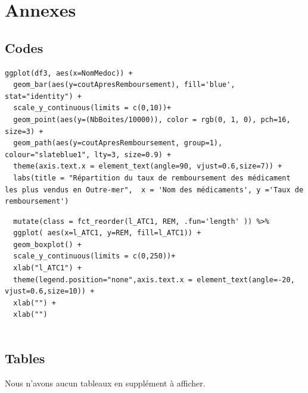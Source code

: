 \documentclass[mstat,12pt]{unswthesis}
\begin{document}



\hypertarget{annexes}{%
\chapter*{Annexes}\label{annexes}}

\hypertarget{codes}{%
\section*{\texorpdfstring{\textbf{Codes}}{Codes}}\label{codes}}

\begin{verbatim}
ggplot(df3, aes(x=NomMedoc)) +
  geom_bar(aes(y=coutApresRemboursement), fill='blue', stat="identity") +
  scale_y_continuous(limits = c(0,10))+
  geom_point(aes(y=(NbBoites/10000)), color = rgb(0, 1, 0), pch=16, size=3) +
  geom_path(aes(y=coutApresRemboursement, group=1), colour="slateblue1", lty=3, size=0.9) +
  theme(axis.text.x = element_text(angle=90, vjust=0.6,size=7)) +
  labs(title = "Répartition du taux de remboursement des médicament les plus vendus en Outre-mer",  x = 'Nom des médicaments', y ='Taux de remboursement')
\end{verbatim}

\bigskip
\bigskip

\begin{verbatim}
  mutate(class = fct_reorder(l_ATC1, REM, .fun='length' )) %>%
  ggplot( aes(x=l_ATC1, y=REM, fill=l_ATC1)) + 
  geom_boxplot() +
  scale_y_continuous(limits = c(0,250))+
  xlab("l_ATC1") +
  theme(legend.position="none",axis.text.x = element_text(angle=-20, vjust=0.6,size=10)) +
  xlab("") +
  xlab("")
  
\end{verbatim}

\hypertarget{tables}{%
\section*{\texorpdfstring{\textbf{Tables}}{Tables}}\label{tables}}

Nous n'avons aucun tableaux en supplément à afficher.
\end{document}
